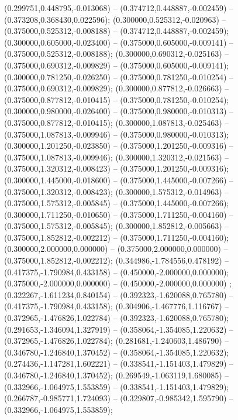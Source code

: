  (0.299751,0.448795,-0.013068) -- (0.374712,0.448887,-0.002459) -- (0.373208,0.368430,0.022596);
 (0.300000,0.525312,-0.020963) -- (0.375000,0.525312,-0.008188) -- (0.374712,0.448887,-0.002459);
 (0.300000,0.605000,-0.023400) -- (0.375000,0.605000,-0.009141) -- (0.375000,0.525312,-0.008188);
 (0.300000,0.690312,-0.025163) -- (0.375000,0.690312,-0.009829) -- (0.375000,0.605000,-0.009141);
 (0.300000,0.781250,-0.026250) -- (0.375000,0.781250,-0.010254) -- (0.375000,0.690312,-0.009829);
 (0.300000,0.877812,-0.026663) -- (0.375000,0.877812,-0.010415) -- (0.375000,0.781250,-0.010254);
 (0.300000,0.980000,-0.026400) -- (0.375000,0.980000,-0.010313) -- (0.375000,0.877812,-0.010415);
 (0.300000,1.087813,-0.025463) -- (0.375000,1.087813,-0.009946) -- (0.375000,0.980000,-0.010313);
 (0.300000,1.201250,-0.023850) -- (0.375000,1.201250,-0.009316) -- (0.375000,1.087813,-0.009946);
 (0.300000,1.320312,-0.021563) -- (0.375000,1.320312,-0.008423) -- (0.375000,1.201250,-0.009316);
 (0.300000,1.445000,-0.018600) -- (0.375000,1.445000,-0.007266) -- (0.375000,1.320312,-0.008423);
 (0.300000,1.575312,-0.014963) -- (0.375000,1.575312,-0.005845) -- (0.375000,1.445000,-0.007266);
 (0.300000,1.711250,-0.010650) -- (0.375000,1.711250,-0.004160) -- (0.375000,1.575312,-0.005845);
 (0.300000,1.852812,-0.005663) -- (0.375000,1.852812,-0.002212) -- (0.375000,1.711250,-0.004160);
 (0.300000,2.000000,0.000000) -- (0.375000,2.000000,0.000000) -- (0.375000,1.852812,-0.002212);
 (0.344986,-1.784556,0.478192) -- (0.417375,-1.790984,0.433158) -- (0.450000,-2.000000,0.000000);
 (0.375000,-2.000000,0.000000) -- (0.450000,-2.000000,0.000000) ;
 (0.322267,-1.611234,0.840154) -- (0.392323,-1.620088,0.765780) -- (0.417375,-1.790984,0.433158);
 (0.304906,-1.467776,1.116767) -- (0.372965,-1.476826,1.022784) -- (0.392323,-1.620088,0.765780);
 (0.291653,-1.346094,1.327919) -- (0.358064,-1.354085,1.220632) -- (0.372965,-1.476826,1.022784);
 (0.281681,-1.240603,1.486790) -- (0.346780,-1.246840,1.370452) -- (0.358064,-1.354085,1.220632);
 (0.274436,-1.147281,1.602221) -- (0.338541,-1.151403,1.479829) -- (0.346780,-1.246840,1.370452);
 (0.269549,-1.063119,1.680085) -- (0.332966,-1.064975,1.553859) -- (0.338541,-1.151403,1.479829);
 (0.266787,-0.985771,1.724093) -- (0.329807,-0.985342,1.595790) -- (0.332966,-1.064975,1.553859);

